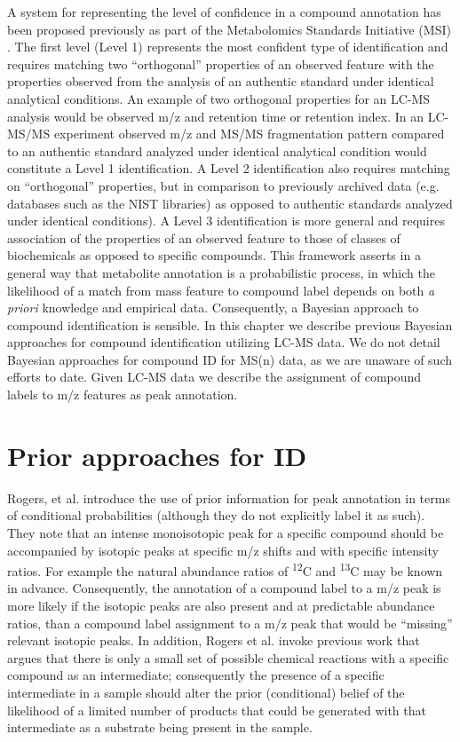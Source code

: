 \begin{DoubleSpace*}
A system for representing the level of confidence in a compound annotation has been proposed previously as part of the Metabolomics Standards Initiative (MSI) \cite{sumner2007}. The first level (Level 1) represents the most confident type of identification and requires matching two ``orthogonal'' properties of an observed feature with the properties observed from the analysis of an authentic standard under identical analytical conditions. An example of two orthogonal properties for an LC-MS analysis would be observed m/z and retention time or retention index. In an LC-MS/MS experiment observed m/z and MS/MS fragmentation pattern compared to an authentic standard analyzed under identical analytical condition would constitute a Level 1 identification.  A Level 2 identification also requires matching on ``orthogonal'' properties, but in comparison to previously archived data (e.g. databases such as the NIST libraries) as opposed to authentic standards analyzed under identical conditions). A Level 3 identification is more general and requires association of the properties of an observed feature to those of classes of biochemicals as opposed to specific compounds. This framework asserts in a general way that metabolite annotation is a probabilistic process, in which the likelihood of a match from mass feature to compound label depends on both \emph{a priori} knowledge and empirical data. Consequently, a Bayesian approach to compound identification is sensible. In this chapter we describe previous Bayesian approaches for compound identification utilizing LC-MS data. We do not detail Bayesian approaches for compound ID for MS(n) data, as we are unaware of such efforts to date. Given LC-MS data we describe the assignment of compound labels to m/z features as peak annotation. 

\section{Prior approaches for ID}
Rogers, et al. \cite{rogers2009} introduce the use of prior information for peak annotation in terms of conditional probabilities (although they do not explicitly label it as such). They note that an intense monoisotopic peak for a specific compound should be accompanied by isotopic peaks at specific m/z shifts and with specific intensity ratios. For example the natural abundance ratios of \textsuperscript{12}C and \textsuperscript{13}C may be known in advance. Consequently, the annotation of a compound label to a m/z peak is more likely if the isotopic peaks are also present and at predictable abundance ratios, than a compound label assignment to a m/z peak that would be ``missing'' relevant isotopic peaks. In addition, Rogers et al. invoke previous work \cite{breitling2006} that argues that there is only a small set of possible chemical reactions with a specific compound as an intermediate; consequently the presence of a specific intermediate in a sample should alter the prior (conditional) belief of the likelihood of a limited number of products that could be generated with that intermediate as a substrate being present in the sample.


\end{DoubleSpace*}
